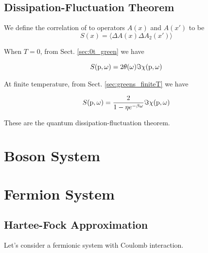 \documentclass[12pt]{book}
\begin{document}
\section{Dissipation-Fluctuation Theorem}
We define the correlation of to operators $A(x)$ and $A(x')$ to be
\begin{equation}
	S(x)=\langle\Delta A(x)\Delta A_2(x')\rangle
\end{equation}

When $T=0$, from Sect. \ref{sec:0t_green} we have

\begin{equation}
	S({\rm p},\omega)=2\theta(\omega)\Im\chi({\rm p},\omega)
\end{equation}

At finite temperature, from Sect. \ref{sec:greens_finiteT} we have

\begin{equation}
	S({\rm p},\omega)=\frac2{1-\eta e^{-\beta\omega}}\Im\chi({\rm p},\omega)
\end{equation}

These are the quantum dissipation-fluctuation theorem.
	
\chapter{Boson System}
	
\chapter{Fermion System}

\section{Hartee-Fock Approximation}

Let's consider a fermionic system with Coulomb interaction. 
\end{document}
